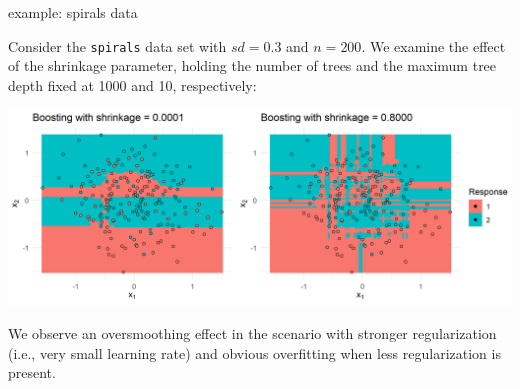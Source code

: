 \begin{vbframe}{example: spirals data}

Consider the \texttt{spirals} data set with $\mathit{sd} = 0.3$ and $n = 200$.
We examine the effect of the shrinkage parameter, holding the number of trees 
and the maximum tree depth fixed at 1000 and 10, respectively:

\vfill

\includegraphics[width = \textwidth]{figure/gbm_regu_oversmoothing_overfitting}

\vfill

We observe an oversmoothing effect in the scenario with stronger regularization 
(i.e., very small learning rate) and obvious overfitting when less 
regularization is present.

\end{vbframe}

\endlecture

